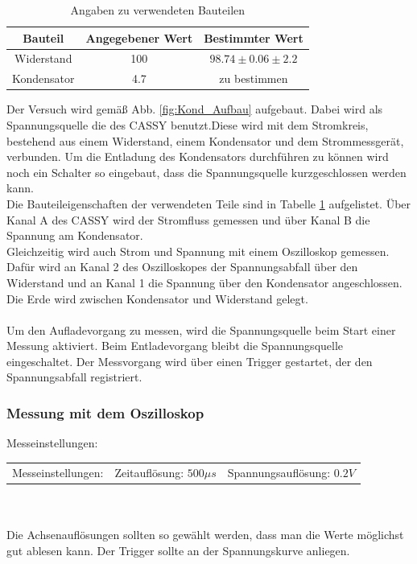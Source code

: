 \documentclass[12pt,a4paper]{article}
\begin{document}
\begin{table}[H]
\begin{center}
\begin{tabular}{|c|c|c|}
\hline 
Bauteil & Angegebener Wert & Bestimmter Wert \\ 
\hline 
Widerstand & 100 & $98.74\pm 0.06\pm2.2$ \\ 
\hline 
Kondensator & 4.7 & zu bestimmen \\ 
\hline 
\end{tabular} 
\end{center}
\caption{Angaben zu verwendeten Bauteilen}
\label{tab:Kond_Hersteller} 
\end{table}

Der Versuch wird gemäß Abb. \ref{fig:Kond_Aufbau} aufgebaut. Dabei wird als Spannungsquelle die des CASSY benutzt.Diese wird mit dem Stromkreis, bestehend aus einem Widerstand, einem Kondensator und dem Strommessgerät, verbunden. Um die Entladung des Kondensators durchführen zu können wird noch ein Schalter so eingebaut, dass die Spannungsquelle kurzgeschlossen werden kann.\\ 
Die Bauteileigenschaften  der verwendeten Teile sind in Tabelle \ref{tab:Kond_Hersteller} aufgelistet.
Über Kanal A des CASSY wird der Stromfluss gemessen und über Kanal B die Spannung am Kondensator.\\
Gleichzeitig wird auch Strom und Spannung mit einem Oszilloskop gemessen. Dafür wird an Kanal 2 des Oszilloskopes der Spannungsabfall über den Widerstand und an Kanal 1 die Spannung über den Kondensator angeschlossen. Die Erde wird zwischen Kondensator und Widerstand gelegt.\\
\\
Um den Aufladevorgang zu messen, wird die Spannungsquelle beim Start einer Messung aktiviert.
Beim Entladevorgang bleibt die Spannungsquelle eingeschaltet. Der Messvorgang wird über einen Trigger gestartet, der den Spannungsabfall registriert.
\subsubsection{Messung mit dem Oszilloskop}
Messeinstellungen:
\begin{tabular}{c c c}
Messeinstellungen: & Zeitauflösung: $500\mu s$  & Spannungsauflösung: $0.2V$ \\ 
\end{tabular} 
\\
\\
Die Achsenauflösungen sollten so gewählt werden, dass man die Werte möglichst gut ablesen kann.
Der Trigger sollte an der Spannungskurve anliegen.
\end{document}
